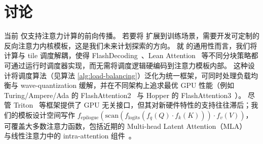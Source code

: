 \section{讨论}
\label{sec:discussions}

当前 \sys 仅支持注意力计算的前向传播。
若要将 \sys 扩展到训练场景，需要开发可定制的反向注意力内核模板，这是我们未来计划探索的方向。
就 \sys 的通用性而言，我们将计算与 tile 调度解耦，使得 FlashDecoding~\cite{flashdecodingpp}、Lean Attention~\cite{sanovar2024lean} 等不同分块策略都可通过运行时调度器实现，而无需将调度逻辑硬编码到注意力模板内部。
这种设计将调度算法（见算法 \ref{alg:load-balancing}）泛化为统一框架，可同时处理负载均衡与 wave-quantization 缓解，并在不同架构上追求最优 GPU 性能（例如 Turing/Ampere/Ada 的 FlashAttention2~\cite{dao2023flashattention2} 与 Hopper 的 FlashAttention3~\cite{jay2024flashattention3}）。
尽管 Triton~\cite{triton} 等框架提供了 GPU 无关接口，但其对新硬件特性的支持往往滞后；我们的模板设计空间写作 $f_\textrm{epilogue}(\textrm{scan}(f_\textrm{logits}(f_{q}(Q)\cdot f_{k}(K)))\cdot f_{v}(V))$，可覆盖大多数注意力函数，包括近期的 Multi-head Latent Attention（MLA）~\cite{deepseekv2} 与线性注意力中的 intra-attention 组件~\cite{yang2024gatedlinearattentiontransformers}。
